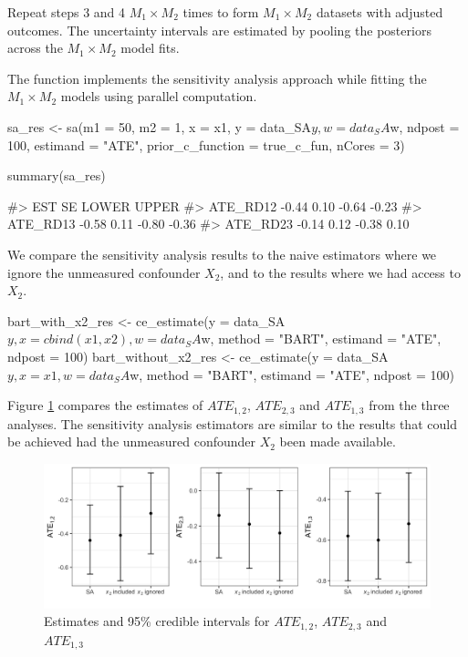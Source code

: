 Repeat steps 3 and 4  $M_1 \times  M_2$ times to form $M_1 \times M_2$ datasets with adjusted outcomes. The uncertainty intervals are estimated by pooling the posteriors  across the $M_1 \times M_2$ model fits. 

The  function implements the sensitivity analysis approach while fitting the $M_1 \times M_2$ models using parallel computation. 
\begin{Schunk}
\begin{Sinput}
sa_res <- sa(m1 = 50, m2 = 1, x = x1, y = data_SA$y, w = data_SA$w, ndpost = 100, 
             estimand = "ATE", prior_c_function =  true_c_fun, nCores = 3)
\end{Sinput}
\end{Schunk}

\begin{Schunk}
\begin{Sinput}
summary(sa_res)
\end{Sinput}
\begin{Soutput}
#>            EST   SE LOWER UPPER
#> ATE_RD12 -0.44 0.10 -0.64 -0.23
#> ATE_RD13 -0.58 0.11 -0.80 -0.36
#> ATE_RD23 -0.14 0.12 -0.38  0.10
\end{Soutput}
\end{Schunk}
We compare the sensitivity analysis results to the naive estimators where we ignore the unmeasured confounder $X_2$, and to the results where we had access to $X_2$. 
\begin{Schunk}
\begin{Sinput}
bart_with_x2_res <- ce_estimate(y = data_SA$y, x = cbind(x1, x2), w = data_SA$w, 
                                method = "BART", estimand = "ATE", ndpost = 100)
bart_without_x2_res <- ce_estimate(y = data_SA$y, x = x1, w = data_SA$w, 
                                   method = "BART", estimand = "ATE", ndpost = 100)
\end{Sinput}
\end{Schunk}

Figure \ref{fig:p_SA_demo} compares the estimates of  $ATE_{1,2}$, $ATE_{2,3}$ and $ATE_{1,3}$ from the three analyses. The sensitivity analysis estimators are similar to the results that could be achieved had the unmeasured confounder $X_2$ been made available. 

\begin{figure}[htbp]
\centering
\includegraphics[width = 1\textwidth]{p_SA_demo.png}
\caption{Estimates and 95\% credible intervals for $ATE_{1,2}$, $ATE_{2,3}$ and $ATE_{1,3}$ }
\label{fig:p_SA_demo}
\end{figure}

